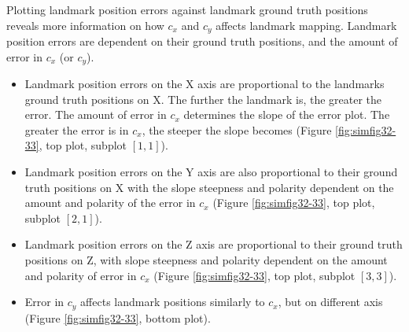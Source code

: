 Plotting landmark position errors against landmark ground truth
positions reveals more information on how $c_{x}$ and $c_{y}$
affects landmark mapping. Landmark position errors are dependent
on their ground truth positions, and the amount of error in $c_{x}$
(or $c_{y}$).

\begin{itemize}
  \item Landmark position errors on the X axis are proportional to the
  landmarks ground truth positions on X. The further the landmark is,
  the greater the error. The amount of error in $c_{x}$
  determines the slope of the error plot. The greater the error is in
  $c_{x}$, the steeper the slope becomes (Figure \ref{fig:simfig32-33},
  top plot, subplot $[1,1]$).
  \item Landmark position errors on the Y axis are also proportional to
  their ground truth positions on X with the slope steepness and
  polarity dependent on the amount and polarity of the error in
  $c_{x}$ (Figure \ref{fig:simfig32-33}, top plot, subplot $[2,1]$).
  \item Landmark position errors on the Z axis are proportional to
  their ground truth positions on Z, with slope steepness and polarity
  dependent on the amount and polarity of error in $c_{x}$ (Figure
  \ref{fig:simfig32-33}, top plot, subplot $[3,3]$).
  \item Error in $c_{y}$ affects landmark positions similarly to
  $c_{x}$, but on different axis (Figure \ref{fig:simfig32-33}, bottom
  plot).
\end{itemize}

